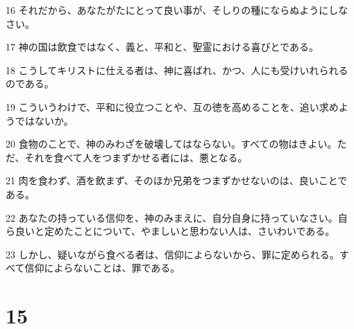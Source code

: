 \par 16 それだから、あなたがたにとって良い事が、そしりの種にならぬようにしなさい。
\par 17 神の国は飲食ではなく、義と、平和と、聖霊における喜びとである。
\par 18 こうしてキリストに仕える者は、神に喜ばれ、かつ、人にも受けいれられるのである。
\par 19 こういうわけで、平和に役立つことや、互の徳を高めることを、追い求めようではないか。
\par 20 食物のことで、神のみわざを破壊してはならない。すべての物はきよい。ただ、それを食べて人をつまずかせる者には、悪となる。
\par 21 肉を食わず、酒を飲まず、そのほか兄弟をつまずかせないのは、良いことである。
\par 22 あなたの持っている信仰を、神のみまえに、自分自身に持っていなさい。自ら良いと定めたことについて、やましいと思わない人は、さいわいである。
\par 23 しかし、疑いながら食べる者は、信仰によらないから、罪に定められる。すべて信仰によらないことは、罪である。

\chapter{15}

